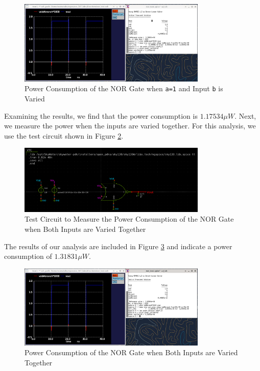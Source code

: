\documentclass[fleqn]{article}
\begin{document}
	\begin{figure}[H]
		\centerline{\includegraphics[width=0.8\textwidth]{nor_power_sweep_vb.png}}
		\caption{Power Consumption of the NOR Gate when \texttt{a=1} and Input \texttt{b} is Varied}
		\label{fig::nor_power_sweep_vb}
	\end{figure}
	
	Examining the results, we find that the power consumption is $1.17534{\mu}W$. Next, we measure the power when the inputs are varied together. For this analysis, we use the test circuit shown in Figure \ref{fig::nor_power_test_sweep_va_vb}.
	
	\begin{figure}[H]
		\centerline{\includegraphics[width=0.8\textwidth]{nor_power_test_sweep_va_vb.png}}
		\caption{Test Circuit to Measure the Power Consumption of the NOR Gate when Both Inputs are Varied Together}
		\label{fig::nor_power_test_sweep_va_vb}
	\end{figure}
	
	The results of our analysis are included in Figure \ref{fig::nor_power_sweep_va_vb} and indicate a power consumption of $1.31831{\mu}W$. 
	
	\begin{figure}[H]
		\centerline{\includegraphics[width=0.8\textwidth]{nor_power_sweep_va_vb.png}}
		\caption{Power Consumption of the NOR Gate when Both Inputs are Varied Together}
		\label{fig::nor_power_sweep_va_vb}
	\end{figure}	
	
\end{document}
